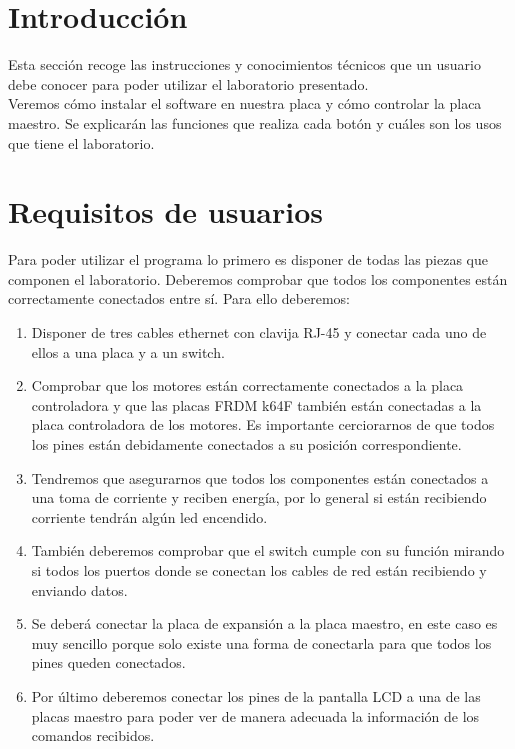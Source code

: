 
\section{Introducción}
Esta sección recoge las instrucciones y conocimientos técnicos que un usuario debe conocer para poder utilizar el laboratorio presentado. \\
Veremos cómo instalar el software en nuestra placa y cómo controlar la placa maestro. Se explicarán las funciones que realiza cada botón y cuáles son los usos que tiene el laboratorio.

\section{Requisitos de usuarios}

Para poder utilizar el programa lo primero es disponer de todas las piezas que componen el laboratorio.
Deberemos comprobar que todos los componentes están correctamente conectados entre sí. Para ello deberemos:
\begin{enumerate}
\item Disponer de tres cables ethernet con clavija RJ-45 y conectar cada uno de ellos a una placa y a un switch.
\item Comprobar que los motores están correctamente conectados a la placa controladora y que las placas FRDM k64F también están conectadas a la placa controladora de los motores. Es importante cerciorarnos de que todos los pines están debidamente conectados a su posición  correspondiente. 
\item Tendremos que asegurarnos que todos los componentes están conectados a una toma de corriente y reciben energía, por lo general si están recibiendo corriente tendrán algún led encendido.
\item También deberemos comprobar que el switch cumple con su función mirando si todos los puertos donde se conectan los cables de red están recibiendo y enviando datos.
\item Se deberá conectar la placa de expansión a la placa maestro, en este caso es muy sencillo porque solo existe una forma de conectarla para que todos los pines queden conectados.
\item Por último deberemos conectar los pines de la pantalla LCD a una de las placas maestro para poder ver de manera adecuada la información de los comandos recibidos.
\end{enumerate}

